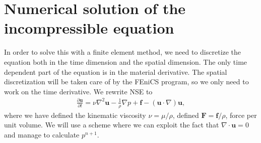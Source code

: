 \documentclass[a4paper,10pt]{article}
\renewcommand{\vec}[1]{\mathbf{#1}}
\renewcommand{\(}{\left(}
\renewcommand{\)}{\right)}
\newcommand{\dpart}[2]{\frac{\partial#1}{\partial#2}}
\begin{document}
\section{Numerical solution of the incompressible equation}
In order to solve this with a finite element method, we need to discretize the equation both in the time dimension and the spatial dimension. The only time dependent part of the equation is in the material derivative. The spatial discretization will be taken care of by the FEniCS program, so we only need to work on the time derivative. We rewrite NSE to
\begin{align*}
  \dpart{\vec u}{t} = \nu\nabla^2\vec u - \frac{1}{\rho}\nabla p + \vec f - (\vec u\cdot \nabla)\vec u,
\end{align*}
where we have defined the kinematic viscosity $\nu=\mu/\rho$, defined $\vec F = \vec f/\rho$, force per unit volume. We will use a scheme where we can exploit the fact that $\nabla \cdot \vec u = 0$ and manage to calculate $p^{n+1}$.
\end{document}

